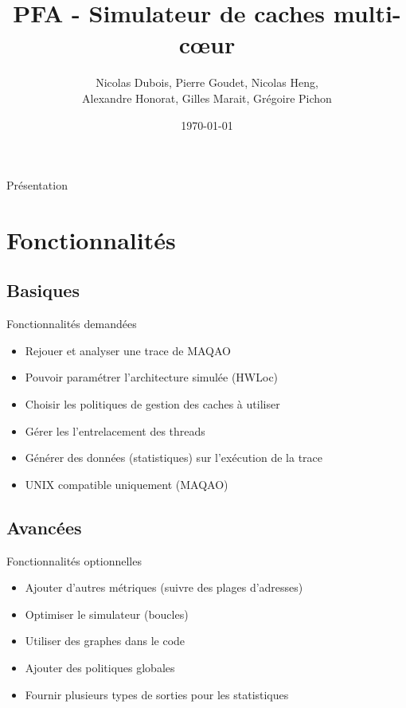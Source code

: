 \documentclass{beamer}
\title[PFA - Simulateur de caches multi-c\oe ur]{PFA - Simulateur de caches multi-c\oe ur}
\author[]{Nicolas Dubois, Pierre Goudet, Nicolas Heng,\\Alexandre Honorat, Gilles Marait, Grégoire Pichon}
\institute[ENSEIRB-MATMECA]{ENSEIRB-MATMECA}
\date{\today}
\begin{document}
\setlength{\unitlength}{1cm}

\begin{frame}{Présentation}

\titlepage

\end{frame}


\section{Fonctionnalités}
\subsection{Basiques}
\begin{frame}
\begin{block}{Fonctionnalités demandées}
\begin{itemize}
  \item{Rejouer et analyser une trace de MAQAO}
  \item{Pouvoir paramétrer l'architecture simulée (HWLoc)}
  \item{Choisir les politiques de gestion des caches à utiliser}
  \item{Gérer les l'entrelacement des threads}
  \item{Générer des données (statistiques) sur l'exécution de la trace}
  \item{UNIX compatible uniquement (MAQAO)}
\end{itemize}
\end{block}
\end{frame}

\subsection{Avancées}
\begin{frame}
\begin{block}{Fonctionnalités optionnelles}
\begin{itemize}
  \item{Ajouter d'autres métriques (suivre des plages d'adresses)}
  \item{Optimiser le simulateur (boucles)}
  \item{Utiliser des graphes dans le code}
  \item{Ajouter des politiques globales}
  \item{Fournir plusieurs types de sorties pour les statistiques}
\end{itemize}
\end{block}
\end{frame}
\end{document}
